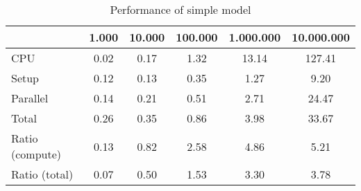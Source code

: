 \begin{table}[!h]
\centering
\caption{Performance of simple model}
\begin{tabular}{l*{5}{c}}\hline
& 1.000 &          10.000 &         100.000 &       1.000.000 &      10.000.000 \\ \hline
CPU &     0.02 &      0.17 &      1.32 &     13.14 &    127.41 \\
Setup &     0.12 &      0.13 &      0.35 &      1.27 &      9.20 \\
Parallel &     0.14 &      0.21 &      0.51 &      2.71 &     24.47 \\
Total &     0.26 &      0.35 &      0.86 &      3.98 &     33.67 \\
Ratio (compute) &     0.13 &      0.82 &      2.58 &      4.86 &      5.21 \\
Ratio (total) &     0.07 &      0.50 &      1.53 &      3.30 &      3.78 \\
\hline
\end{tabular}
\end{table}
